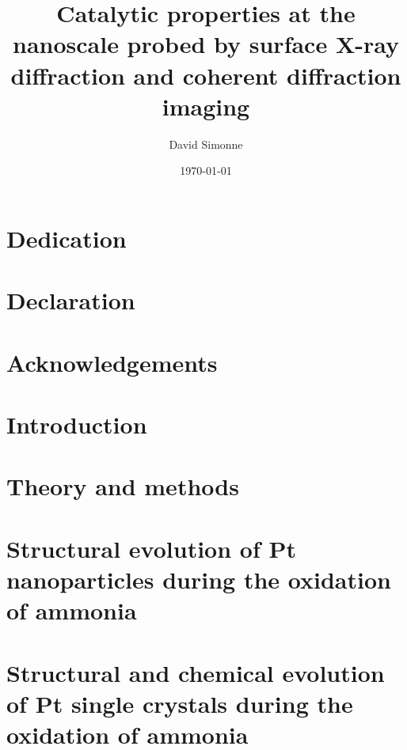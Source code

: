 \documentclass[11pt]{report}
\title{Catalytic properties at the nanoscale probed by surface X-ray diffraction and coherent diffraction imaging}
\author{David Simonne}
\date{\today}
\begin{document}
    

    \chapter*{Dedication}
    
    \chapter*{Declaration}
    
    \chapter*{Acknowledgements}
    

\frontmatter
{\hypersetup{linkcolor=black}
    \tableofcontents
}
\newpage

\mainmatter
    \chapter{Introduction}
    
     
    \chapter{Theory and methods}
    
    
    
    
    
    
    \chapter{Structural evolution of Pt nanoparticles during the oxidation of ammonia}
    
    
    
    
    

    \chapter{Structural and chemical evolution of Pt single crystals during the oxidation of ammonia}
    
    
    
    
\end{document}
